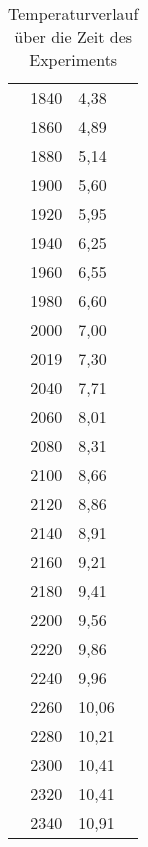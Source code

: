 \begin{table}[h]
\begin{tabular}{rl}
1840	&	4,38\\
1860	&	4,89\\
1880	&	5,14\\
1900	&	5,60\\
1920	&	5,95\\
1940	&	6,25\\
1960	&	6,55\\
1980	&	6,60\\
2000	&	7,00\\
2019	&	7,30\\
2040	&	7,71\\
2060	&	8,01\\
2080	&	8,31\\
2100	&	8,66\\
2120	&	8,86\\
2140	&	8,91\\
2160	&	9,21\\
2180	&	9,41\\
2200	&	9,56\\
2220	&	9,86\\
2240	&	9,96\\
2260	&	10,06\\
2280	&	10,21\\
2300	&	10,41\\
2320	&	10,41\\
2340	&	10,91\\
\end{tabular}
\normalsize
\caption{Temperaturverlauf über die Zeit des Experiments}
\end{table}
